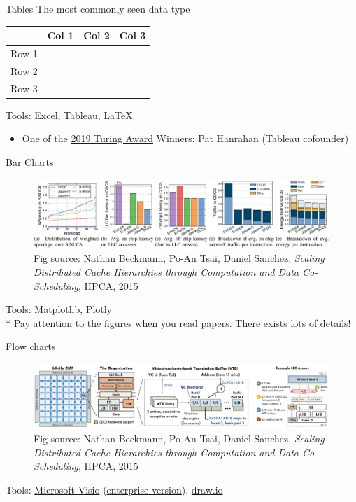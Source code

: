 \documentclass{../TexTemplate/myslide}
\begin{document}
\begin{frame}{Tables}
The most commonly seen data type
\begin{center}
\begin{tabular}{cccc}\hline
 & Col 1 & Col 2 & Col 3\\\hline
Row 1 & & &\\
Row 2 & & &\\
Row 3 & & &\\\hline
\end{tabular}
\end{center}
Tools: Excel, \href{https://www.tableau.com/}{Tableau}, \LaTeX
\begin{itemize}
	\item One of the \href{https://awards.acm.org/about/2019-turing}{2019 Turing Award} Winners: Pat Hanrahan (Tableau cofounder)
\end{itemize}
\end{frame}

\begin{frame}{Bar Charts}
\begin{figure}
\centering
\includegraphics[width=\linewidth]{fig/bar_chart_eg.png}
\caption*{\small Fig source: Nathan Beckmann, Po-An Tsai, Daniel Sanchez, \emph{Scaling Distributed Cache Hierarchies through Computation and Data Co-Scheduling}, HPCA, 2015}
\end{figure}
Tools: \href{https://matplotlib.org/}{Matplotlib}, \href{https://plot.ly/}{Plotly}\\
* Pay attention to the figures when you read papers. There exists lots of details!
\end{frame}

\begin{frame}{Flow charts}
\begin{figure}
\centering
\includegraphics[width=\linewidth]{fig/flow_chart_eg.png}
\caption*{\small Fig source: Nathan Beckmann, Po-An Tsai, Daniel Sanchez, \emph{Scaling Distributed Cache Hierarchies through Computation and Data Co-Scheduling}, HPCA, 2015}
\end{figure}
Tools: \href{https://products.office.com/en-us/visio/flowchart-software}{Microsoft Visio} (\href{https://ms.sysu.edu.cn/}{enterprise version}), \href{https://www.draw.io/}{draw.io}
\end{frame}
\end{document}
